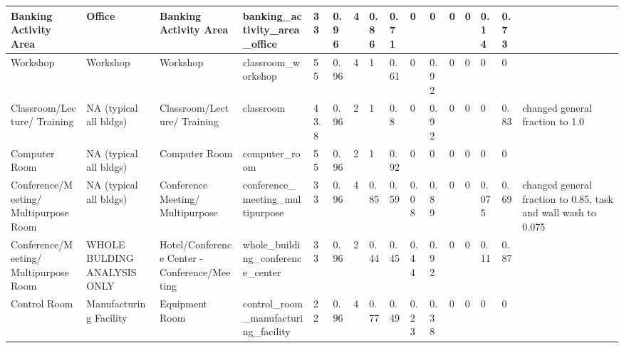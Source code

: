 \begin{center}
\begin{landscape}
\begin{longtable}{|p{0.75in}|p{0.75in}|p{0.75in}|p{0.75in}|p{0.3in}|p{0.3in}|p{0.3in}|p{0.3in}|p{0.3in}|p{0.3in}|p{0.3in}|p{0.3in}|p{0.3in}|p{0.3in}|p{0.3in}|p{0.6in}|}
      Banking Activity Area                   & Office                      & Banking Activity Area                           & banking\_activity\_area\_office                                 & 33   & 0.96 & 4  & 0.86   & 0.71  & 0     & 0     & 0    & 0    & 0.14 & 0.73 &                                                                                       \\ \hline
      Workshop                                & Workshop                    & Workshop                                        & classroom\_workshop                                             & 55   & 0.96 & 4  & 1      & 0.61  & 0     & 0.92  & 0    & 0    & 0    & 0    &                                                                                       \\ \hline
      Classroom/Lecture/ Training          & NA (typical all bldgs)  & Classroom/Lecture/ Training                      & classroom                                                       & 43.8 & 0.96 & 2  & 1      & 0.8   & 0     & 0.92  & 0    & 0    & 0    & 0.83 & changed general fraction to 1.0                                                       \\ \hline
      Computer Room                           & NA (typical all bldgs)      & Computer Room                                   & computer\_room                                                  & 55   & 0.96 & 2  & 1      & 0.92  & 0     & 0     & 0    & 0    & 0    & 0    &                                                                                       \\ \hline
      Conference/Meeting/ Multipurpose Room    & NA (typical all bldgs)  & Conference Meeting/ Multipurpose                 & conference\_meeting\_multipurpose                               & 33   & 0.96 & 4  & 0.85   & 0.59  & 0.08  & 0.89  & 0    & 0    & 0.075& 0.69 & changed general fraction to 0.85, task and wall wash to 0.075                         \\ \hline
      Conference/Meeting/ Multipurpose Room    & WHOLE BULDING ANALYSIS ONLY & Hotel/Conference Center - Conference/Meeting    & whole\_building\_conference\_center                             & 33   & 0.96 & 2  & 0.44   & 0.45  & 0.44  & 0.92  & 0    & 0    & 0.11 & 0.87 &                                                                                       \\ \hline
      Control Room                            & Manufacturing Facility      & Equipment Room                                  & control\_room\_manufacturing\_facility                          & 22   & 0.96 & 4  & 0.77   & 0.49  & 0.23  & 0.38  & 0    & 0    & 0    & 0    &                                                                                       \\ \hline

\end{longtable}
\end{landscape}
\end{center}
